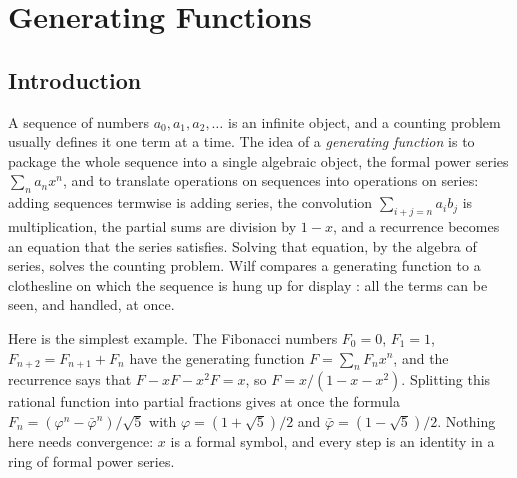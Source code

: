 \chapter{Generating Functions}\label{generating-functions}

\section{Introduction}\label{generating-functions:section-introduction}

A sequence of numbers $a_0, a_1, a_2, \ldots$ is an infinite object, and a counting problem usually defines it one term at a time. The idea of a \emph{generating function} is to package the
whole sequence into a single algebraic object, the formal power series $\sum_n a_nx^n$, and to translate operations on sequences into operations on series: adding sequences termwise is adding
series, the convolution $\sum_{i+j=n}a_ib_j$ is multiplication, the partial sums are division by $1 - x$, and a recurrence becomes an equation that the series satisfies. Solving that equation, by
the algebra of series, solves the counting problem. Wilf compares a generating function to a clothesline on which the sequence is hung up for display
\cite{wilf-generatingfunctionology}: all the terms can be seen, and handled, at once.

Here is the simplest example. The Fibonacci numbers $F_0 = 0$, $F_1 = 1$, $F_{n+2} = F_{n+1} + F_n$ have the generating function $F = \sum_nF_nx^n$, and the recurrence says that
$F - xF - x^2F = x$, so $F = x/(1 - x - x^2)$. Splitting this rational function into partial fractions gives at once the formula $F_n = (\varphi^n - \bar{\varphi}^n)/\sqrt 5$ with
$\varphi = (1 + \sqrt 5)/2$ and $\bar{\varphi} = (1 - \sqrt 5)/2$. Nothing here needs convergence: $x$ is a formal symbol, and every step is an identity in a ring of formal power series.

